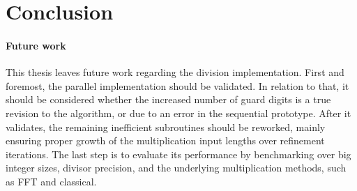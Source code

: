 \section{Conclusion}
\label{sec:conc}
{\red [Missing]}

\paragraph{Future work}
This thesis leaves future work regarding the division implementation. First and
foremost, the parallel implementation should be validated. In relation to that,
it should be considered whether the increased number of guard digits is a true
revision to the algorithm, or due to an error in the sequential prototype. After
it validates, the remaining inefficient subroutines should be reworked, mainly
ensuring proper growth of the multiplication input lengths over refinement
iterations. The last step is to evaluate its performance by benchmarking over
big integer sizes, divisor precision, and the underlying multiplication methods,
such as FFT and classical.

